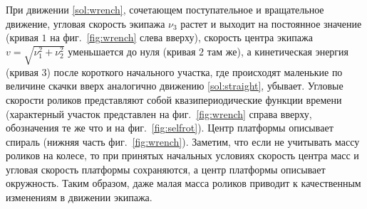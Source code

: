 При движении \ref{sol:wrench}, сочетающем поступательное и вращательное движение, угловая скорость экипажа $\nu_3$ растет и выходит на постоянное значение (кривая $1$ на фиг.~\ref{fig:wrench} слева вверху), скорость центра экипажа $v = \sqrt{\nu_1^2+\nu_2^2}$ уменьшается до нуля (кривая $2$ там же), а кинетическая энергия (кривая $3$) после короткого начального участка, где происходят маленькие по величине скачки вверх аналогично движению \ref{sol:straight}, убывает. Угловые скорости роликов представляют собой квазипериодические функции времени (характерный участок представлен на фиг.~\ref{fig:wrench} справа вверху, обозначения те же что и на фиг.~\ref{fig:selfrot}). Центр платформы описывает спираль (нижняя часть фиг.~\ref{fig:wrench}). Заметим, что если не учитывать массу роликов на колесе, то при принятых начальных условиях скорость центра масс и угловая скорость платформы сохраняются, а центр платформы описывает окружность. Таким образом, даже малая масса роликов приводит к качественным изменениям в движении экипажа.


